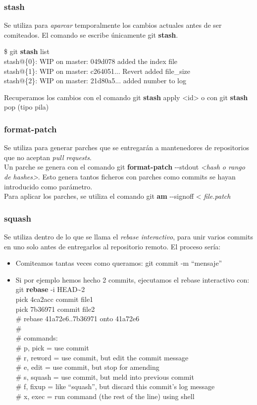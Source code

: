 \frame
{
\frametitle{stash}
 Se utiliza para \textit{aparcar} temporalmente los cambios actuales antes de ser comiteados. El comando se escribe únicamente git \textbf{stash}.
 \begin{framed}
 \$ git \textbf{stash} list\\
 stash@\{0\}: WIP on master: 049d078 added the index file\\
 stash@\{1\}: WIP on master: c264051... Revert added file\_size\\
 stash@\{2\}: WIP on master: 21d80a5... added number to log
 \end{framed}
 
 Recuperamos los cambios con el comando git \textbf{stash} apply <id> o con git \textbf{stash} pop (tipo pila)
}

\frame
{
\frametitle{format-patch}
 Se utiliza para generar parches que se entregarán a mantenedores de repositorios que no aceptan \textit{pull requests}.\\ \vspace{0.2cm}
 Un parche se genera con el comando git \textbf{format-patch} -{}-stdout \textit{<hash o rango de hashes>}. Esto genera tantos ficheros con parches como commits se hayan introducido como parámetro.\\ \vspace{0.2cm}
 Para aplicar los parches, se utiliza el comando git \textbf{am} -{}-signoff < \textit{file.patch}
}

\frame
{
\frametitle{squash}
 Se utiliza dentro de lo que se llama el \textit{rebase interactivo}, para unir varios commits en uno solo antes de entregarlos al repositorio remoto. El proceso sería:
 \begin{itemize}
  \item Comiteamos tantas veces como queramos: git commit -m ``mensaje''
  \item Si por ejemplo hemos hecho 2 commits, ejecutamos el rebase interactivo con: git \textbf{rebase} -i HEAD\textasciitilde2\\ \vspace{0.2cm}
  \footnotesize
   pick 4ca2acc commit file1\\
   pick 7b36971 commit file2\\
   
   \# rebase 41a72e6..7b36971 onto 41a72e6\\
   \#\\
   \# commands:\\
   \#  p, pick = use commit\\
   \#  r, reword = use commit, but edit the commit message\\
   \#  e, edit = use commit, but stop for amending\\
   \#  s, squash = use commit, but meld into previous commit\\
   \#  f, fixup = like ``squash'', but discard this commit's log message\\
   \#  x, exec = run command (the rest of the line) using shell
\end{itemize}
}

